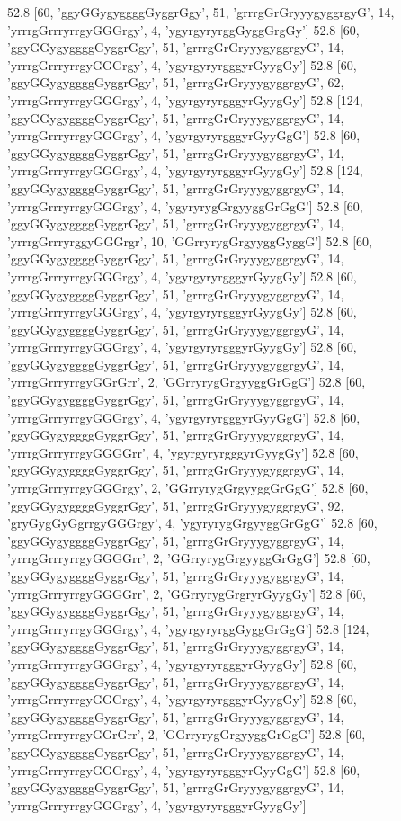 52.8 [60, 'ggyGGygyggggGyggrGgy', 51, 'grrrgGrGryyygyggrgyG', 14, 'yrrrgGrrryrrgyGGGrgy', 4, 'ygyrgyryrggGyggGrgGy']
52.8 [60, 'ggyGGygyggggGyggrGgy', 51, 'grrrgGrGryyygyggrgyG', 14, 'yrrrgGrrryrrgyGGGrgy', 4, 'ygyrgyryrgggyrGyygGy']
52.8 [60, 'ggyGGygyggggGyggrGgy', 51, 'grrrgGrGryyygyggrgyG', 62, 'yrrrgGrrryrrgyGGGrgy', 4, 'ygyrgyryrgggyrGyygGy']
52.8 [124, 'ggyGGygyggggGyggrGgy', 51, 'grrrgGrGryyygyggrgyG', 14, 'yrrrgGrrryrrgyGGGrgy', 4, 'ygyrgyryrgggyrGyyGgG']
52.8 [60, 'ggyGGygyggggGyggrGgy', 51, 'grrrgGrGryyygyggrgyG', 14, 'yrrrgGrrryrrgyGGGrgy', 4, 'ygyrgyryrgggyrGyygGy']
52.8 [124, 'ggyGGygyggggGyggrGgy', 51, 'grrrgGrGryyygyggrgyG', 14, 'yrrrgGrrryrrgyGGGrgy', 4, 'ygyryrygGrgyyggGrGgG']
52.8 [60, 'ggyGGygyggggGyggrGgy', 51, 'grrrgGrGryyygyggrgyG', 14, 'yrrrgGrrryrggyGGGrgr', 10, 'GGrryrygGrgyyggGyggG']
52.8 [60, 'ggyGGygyggggGyggrGgy', 51, 'grrrgGrGryyygyggrgyG', 14, 'yrrrgGrrryrrgyGGGrgy', 4, 'ygyrgyryrgggyrGyygGy']
52.8 [60, 'ggyGGygyggggGyggrGgy', 51, 'grrrgGrGryyygyggrgyG', 14, 'yrrrgGrrryrrgyGGGrgy', 4, 'ygyrgyryrgggyrGyygGy']
52.8 [60, 'ggyGGygyggggGyggrGgy', 51, 'grrrgGrGryyygyggrgyG', 14, 'yrrrgGrrryrrgyGGGrgy', 4, 'ygyrgyryrgggyrGyygGy']
52.8 [60, 'ggyGGygyggggGyggrGgy', 51, 'grrrgGrGryyygyggrgyG', 14, 'yrrrgGrrryrrgyGGrGrr', 2, 'GGrryrygGrgyyggGrGgG']
52.8 [60, 'ggyGGygyggggGyggrGgy', 51, 'grrrgGrGryyygyggrgyG', 14, 'yrrrgGrrryrrgyGGGrgy', 4, 'ygyrgyryrgggyrGyyGgG']
52.8 [60, 'ggyGGygyggggGyggrGgy', 51, 'grrrgGrGryyygyggrgyG', 14, 'yrrrgGrrryrrgyGGGGrr', 4, 'ygyrgyryrgggyrGyygGy']
52.8 [60, 'ggyGGygyggggGyggrGgy', 51, 'grrrgGrGryyygyggrgyG', 14, 'yrrrgGrrryrrgyGGGrgy', 2, 'GGrryrygGrgyyggGrGgG']
52.8 [60, 'ggyGGygyggggGyggrGgy', 51, 'grrrgGrGryyygyggrgyG', 92, 'gryGygGyGgrrgyGGGrgy', 4, 'ygyryrygGrgyyggGrGgG']
52.8 [60, 'ggyGGygyggggGyggrGgy', 51, 'grrrgGrGryyygyggrgyG', 14, 'yrrrgGrrryrrgyGGGGrr', 2, 'GGrryrygGrgyyggGrGgG']
52.8 [60, 'ggyGGygyggggGyggrGgy', 51, 'grrrgGrGryyygyggrgyG', 14, 'yrrrgGrrryrrgyGGGGrr', 2, 'GGrryrygGrgryrGyygGy']
52.8 [60, 'ggyGGygyggggGyggrGgy', 51, 'grrrgGrGryyygyggrgyG', 14, 'yrrrgGrrryrrgyGGGrgy', 4, 'ygyrgyryrggGyggGrGgG']
52.8 [124, 'ggyGGygyggggGyggrGgy', 51, 'grrrgGrGryyygyggrgyG', 14, 'yrrrgGrrryrrgyGGGrgy', 4, 'ygyrgyryrgggyrGyygGy']
52.8 [60, 'ggyGGygyggggGyggrGgy', 51, 'grrrgGrGryyygyggrgyG', 14, 'yrrrgGrrryrrgyGGGrgy', 4, 'ygyrgyryrgggyrGyygGy']
52.8 [60, 'ggyGGygyggggGyggrGgy', 51, 'grrrgGrGryyygyggrgyG', 14, 'yrrrgGrrryrrgyGGrGrr', 2, 'GGrryrygGrgyyggGrGgG']
52.8 [60, 'ggyGGygyggggGyggrGgy', 51, 'grrrgGrGryyygyggrgyG', 14, 'yrrrgGrrryrrgyGGGrgy', 4, 'ygyrgyryrgggyrGyyGgG']
52.8 [60, 'ggyGGygyggggGyggrGgy', 51, 'grrrgGrGryyygyggrgyG', 14, 'yrrrgGrrryrrgyGGGrgy', 4, 'ygyrgyryrgggyrGyygGy']
